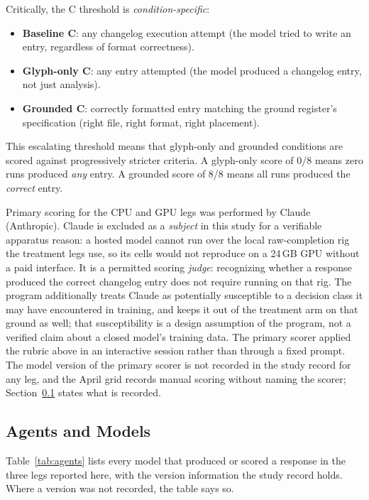 \documentclass[11pt,a4paper]{article}
\begin{document}
Critically, the C threshold is \emph{condition-specific}:

\begin{itemize}
  \item \textbf{Baseline C}: any changelog execution attempt (the model tried
    to write an entry, regardless of format correctness).
  \item \textbf{Glyph-only C}: any entry attempted (the model produced a
    changelog entry, not just analysis).
  \item \textbf{Grounded C}: correctly formatted entry matching the ground
    register's specification (right file, right format, right placement).
\end{itemize}

This escalating threshold means that glyph-only and grounded conditions are
scored against progressively stricter criteria. A glyph-only score of 0/8
means zero runs produced \emph{any} entry. A grounded score of 8/8 means all
runs produced the \emph{correct} entry.

Primary scoring for the CPU and GPU legs was performed by Claude (Anthropic).
Claude is excluded as a \emph{subject} in this study for a verifiable apparatus
reason: a hosted model cannot run over the local raw-completion rig the treatment
legs use, so its cells would not reproduce on a 24\,GB GPU without a paid interface. It is a permitted scoring \emph{judge}: recognizing whether a
response produced the correct changelog entry does not require running on that rig.
The program additionally treats Claude as potentially susceptible to a decision
class it may have encountered in training, and keeps it out of the treatment arm on
that ground as well; that susceptibility is a design assumption of the program, not
a verified claim about a closed model's training data. The primary scorer applied the rubric
above in an interactive session rather than through a fixed prompt. The model
version of the primary scorer is not recorded in the study record for any leg,
and the April grid records manual scoring without naming the scorer;
Section~\ref{sec:agents} states what is recorded.

\subsection{Agents and Models}
\label{sec:agents}

Table~\ref{tab:agents} lists every model that produced or scored a response
in the three legs reported here, with the version information the study
record holds. Where a version was not
recorded, the table says so.
\end{document}
